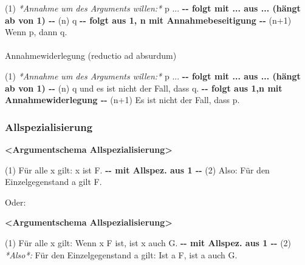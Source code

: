 \documentclass[
  english,
  a4paper,
]{article}
\makeatletter
\let\oldparagraph\paragraph
\renewcommand{\paragraph}{
    \@ifstar
      \xxxParagraphStar
      \xxxParagraphNoStar
  }
\newcommand{\xxxParagraphStar}[1]{\oldparagraph*{#1}\mbox{}}
\newcommand{\xxxParagraphNoStar}[1]{\oldparagraph{#1}\mbox{}}
\newenvironment{Shaded}{\begin{snugshade}}{\end{snugshade}}
\newcommand{\AlertTok}[1]{\textcolor[rgb]{0.02,0.51,0.79}{\textbf{#1}}}
\newcommand{\ErrorTok}[1]{\textcolor[rgb]{0.02,0.51,0.79}{#1}}
\newcommand{\FloatTok}[1]{\textcolor[rgb]{0.12,0.11,0.11}{\textit{#1}}}
\newcommand{\NormalTok}[1]{\textcolor[rgb]{0.12,0.11,0.11}{#1}}
\newcommand{\WarningTok}[1]{\textcolor[rgb]{0.46,0.73,0.89}{\textbf{#1}}}
\renewenvironment{Shaded}{\centering \begin{mdframed}[style=codedefault]}{\end{mdframed}}%
\newenvironment{Shaded}{\centering \begin{mdframed}[style=codedefault]}{\end{mdframed}}%
\makeatother
\begin{document}
\begin{Shaded}
\begin{Highlighting}[]
\ErrorTok{(1)}\FloatTok{ *Annahme um des Arguments willen:* }\NormalTok{p}
\NormalTok{   ...}
\WarningTok{{-}{-} folgt mit ... aus ... (hängt ab von 1) {-}{-}}
\NormalTok{(n) q}
\WarningTok{{-}{-} folgt aus 1, n mit Annahmebeseitigung {-}{-}}
\NormalTok{(n+1) Wenn p, dann q.}
\end{Highlighting}
\end{Shaded}

\paragraph{Annahmewiderlegung (reductio ad
absurdum)}\label{annahmewiderlegung-reductio-ad-absurdum}

\begin{Shaded}
\begin{Highlighting}[]
\ErrorTok{(1)}\FloatTok{ *Annahme um des Arguments willen:* }\NormalTok{p}
\NormalTok{   ...}
\WarningTok{{-}{-} folgt mit ... aus ... (hängt ab von 1) {-}{-}}
\NormalTok{(n) q und es ist nicht der Fall, dass q.}
\WarningTok{{-}{-} folgt aus 1,n mit Annahmewiderlegung {-}{-}}
\NormalTok{(n+1) Es ist nicht der Fall, dass p.}
\end{Highlighting}
\end{Shaded}

\subsubsection{Allspezialisierung}\label{allspezialisierung}

\begin{Shaded}
\begin{Highlighting}[]
\AlertTok{\textless{}Argumentschema Allspezialisierung\textgreater{}}

\ErrorTok{(1)}\NormalTok{ Für alle x gilt: x ist F.}
\WarningTok{{-}{-} mit Allspez. aus 1 {-}{-}}
\ErrorTok{(2)}\NormalTok{ Also: Für den Einzelgegenstand a gilt F.}
\end{Highlighting}
\end{Shaded}

Oder:

\begin{Shaded}
\begin{Highlighting}[]
\AlertTok{\textless{}Argumentschema Allspezialisierung\textgreater{}}

\ErrorTok{(1)}\NormalTok{ Für alle x gilt: Wenn x F ist, ist x auch G.}
\WarningTok{{-}{-} mit Allspez. aus 1 {-}{-}}
\ErrorTok{(2)}\FloatTok{ *Also*:}\NormalTok{ Für den Einzelgegenstand a gilt: Ist a F,}
\NormalTok{    ist a auch G.}
\end{Highlighting}
\end{Shaded}
\end{document}
